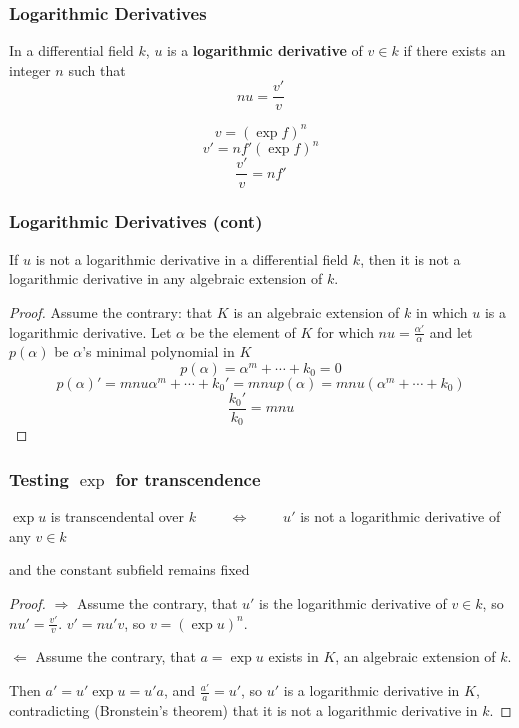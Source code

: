 \documentclass[aspectratio=169,dvipsnames]{beamer}
\begin{document}
\begin{frame}
\frametitle{Logarithmic Derivatives}
\begin{definition}
In a differential field $k$,
$u$ is a {\bf logarithmic derivative} of $v \in k$ if there exists an
integer $n$ such that
\[ nu=\frac{v'}{v} \]
\end{definition}
\[ v = (\exp f)^n \]
\[ v' = n f' (\exp f)^n \]
\[ \frac{v'}{v} = n f' \]
\end{frame}

\begin{frame}
\frametitle{Logarithmic Derivatives (cont)}
\begin{theorem}[Bronstein]
If $u$ is not a logarithmic derivative in a differential field $k$,
then it is not a logarithmic derivative in any algebraic extension of $k$.
\end{theorem}
\begin{proof}
Assume the contrary: that $K$ is an algebraic extension of $k$ in which $u$
is a logarithmic derivative.  Let $\alpha$ be the element of $K$ for which
$nu=\frac{\alpha'}{\alpha}$ and let $p(\alpha)$ be $\alpha$'s minimal polynomial in $K$
\[ p(\alpha) = \alpha^m + \cdots + k_0 = 0 \]
\[ p(\alpha)' = m n u \alpha^m + \cdots + k_0' = m n u p(\alpha) = m n u (\alpha^m + \cdots + k_0)\]
\[ \frac{k_0'}{k_0} = m n u \]
\end{proof}
\end{frame}

\begin{frame}
\frametitle{Testing $\exp$ for transcendence}
\begin{theorem}
$\exp u$ is transcendental over $k$
$\qquad\Longleftrightarrow\qquad$
$u'$ is not a logarithmic derivative of any $v \in k$

and the constant subfield remains fixed
\end{theorem}
\begin{proof}
$\Rightarrow$
Assume the contrary, that $u'$ is the logarithmic derivative of $v \in k$,
so $nu' = \frac{v'}{v}$.  $v' = n u' v$, so $v = (\exp u)^n$.
\bigskip

$\Leftarrow$
Assume the contrary, that $a=\exp u$ exists in $K$, an algebraic extension of $k$.

Then $a' = u' \exp u = u' a$, and $\frac{a'}{a} = u'$, so $u'$ is a logarithmic
derivative in $K$, contradicting (Bronstein's theorem)
that it is not a logarithmic derivative in $k$.
\end{proof}
\end{frame}
\end{document}
